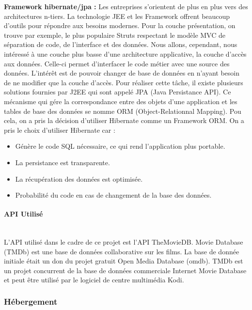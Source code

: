 \documentclass[12pt]{article}
\begin{document}
\begin{description}
\begin{itemize}
    \end{itemize}
    
    
    \item \textbf{ Framework hibernate/jpa :} \newline
    Les entreprises s’orientent de plus en plus vers des architectures n-tiers. La technologie JEE et les Framework  offrent beaucoup d’outils pour répondre aux besoins modernes. Pour la couche présentation, on trouve par exemple, le plus populaire Struts respectant le modèle MVC de séparation de code, de l’interface et des données. Nous allons,  cependant, nous intéressé à une couche plus basse d’une architecture applicative, la couche d’accès aux données. Celle-ci permet d’interfacer le code métier avec une source des données. L’intérêt est de pouvoir changer de base de données en n’ayant besoin de ne modifier que la couche d’accès. Pour réaliser cette tâche, il existe plusieurs solutions fournies par J2EE qui sont appelé JPA (Java Persistance API). Ce mécanisme qui gére la correspondance entre des objets d’une  application et les tables de base des données se nomme ORM (Object-Relationnal Mapping). Pou  cela, on a pris la décision d’utiliser Hibernate comme un Framework ORM. On a pris le choix d’utiliser Hibernate car :
    \begin{itemize}
        \item Génère le code SQL nécessaire, ce qui rend l’application plus portable.
        \item  La persistance est transparente.
        \item  La récupération des données est optimisée.
        \item  Probabilité du code en cas de changement de la base des données.
    \end{itemize}
    \end{description}
\paragraph{API Utilisé} \leavevmode \\
L'API utilisé dans le cadre de ce projet est l'API TheMovieDB. Movie Database (TMDb) est une base de données collaborative sur les films. La base de donnée initiale était un don du projet gratuit Open Media Database (omdb). TMDb est un projet concurrent de la base de données commerciale Internet Movie Database et peut être utilisé par le logiciel de centre multimédia Kodi.

\subsubsection{Hébergement}
\end{document}
